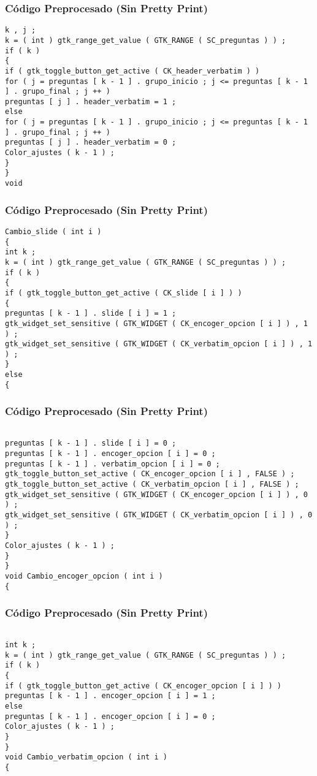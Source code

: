 \documentclass{beamer}
\begin{document}
\begin{frame}[fragile]
\frametitle{C\'odigo Preprocesado (Sin Pretty Print)}
\begin{lstlisting}[style=CStyle]
k , j ; 
k = ( int ) gtk_range_get_value ( GTK_RANGE ( SC_preguntas ) ) ; 
if ( k ) 
{ 
if ( gtk_toggle_button_get_active ( CK_header_verbatim ) ) 
for ( j = preguntas [ k - 1 ] . grupo_inicio ; j <= preguntas [ k - 1 ] . grupo_final ; j ++ ) 
preguntas [ j ] . header_verbatim = 1 ; 
else 
for ( j = preguntas [ k - 1 ] . grupo_inicio ; j <= preguntas [ k - 1 ] . grupo_final ; j ++ ) 
preguntas [ j ] . header_verbatim = 0 ; 
Color_ajustes ( k - 1 ) ; 
} 
} 
void \end{lstlisting}
\end{frame}
\begin{frame}[fragile]
\frametitle{C\'odigo Preprocesado (Sin Pretty Print)}
\begin{lstlisting}[style=CStyle]
Cambio_slide ( int i ) 
{ 
int k ; 
k = ( int ) gtk_range_get_value ( GTK_RANGE ( SC_preguntas ) ) ; 
if ( k ) 
{ 
if ( gtk_toggle_button_get_active ( CK_slide [ i ] ) ) 
{ 
preguntas [ k - 1 ] . slide [ i ] = 1 ; 
gtk_widget_set_sensitive ( GTK_WIDGET ( CK_encoger_opcion [ i ] ) , 1 ) ; 
gtk_widget_set_sensitive ( GTK_WIDGET ( CK_verbatim_opcion [ i ] ) , 1 ) ; 
} 
else 
{ \end{lstlisting}
\end{frame}
\begin{frame}[fragile]
\frametitle{C\'odigo Preprocesado (Sin Pretty Print)}
\begin{lstlisting}[style=CStyle]

preguntas [ k - 1 ] . slide [ i ] = 0 ; 
preguntas [ k - 1 ] . encoger_opcion [ i ] = 0 ; 
preguntas [ k - 1 ] . verbatim_opcion [ i ] = 0 ; 
gtk_toggle_button_set_active ( CK_encoger_opcion [ i ] , FALSE ) ; 
gtk_toggle_button_set_active ( CK_verbatim_opcion [ i ] , FALSE ) ; 
gtk_widget_set_sensitive ( GTK_WIDGET ( CK_encoger_opcion [ i ] ) , 0 ) ; 
gtk_widget_set_sensitive ( GTK_WIDGET ( CK_verbatim_opcion [ i ] ) , 0 ) ; 
} 
Color_ajustes ( k - 1 ) ; 
} 
} 
void Cambio_encoger_opcion ( int i ) 
{ \end{lstlisting}
\end{frame}
\begin{frame}[fragile]
\frametitle{C\'odigo Preprocesado (Sin Pretty Print)}
\begin{lstlisting}[style=CStyle]

int k ; 
k = ( int ) gtk_range_get_value ( GTK_RANGE ( SC_preguntas ) ) ; 
if ( k ) 
{ 
if ( gtk_toggle_button_get_active ( CK_encoger_opcion [ i ] ) ) 
preguntas [ k - 1 ] . encoger_opcion [ i ] = 1 ; 
else 
preguntas [ k - 1 ] . encoger_opcion [ i ] = 0 ; 
Color_ajustes ( k - 1 ) ; 
} 
} 
void Cambio_verbatim_opcion ( int i ) 
{ \end{lstlisting}
\end{frame}
\end{document}
